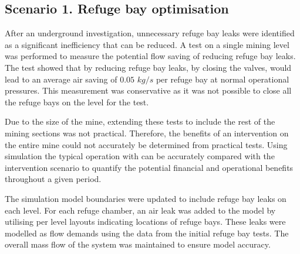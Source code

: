 	\subsection{Scenario 1. Refuge bay optimisation}
	After an underground investigation, unnecessary refuge bay leaks were identified as a significant inefficiency that can be reduced. A test on a single mining level was performed to measure the potential flow saving of reducing refuge bay leaks. The test showed that by reducing refuge bay leaks, by closing the valves, would lead to an average air saving of $0.05$ $kg/s$ per refuge bay at normal operational pressures. This measurement was conservative as it was not possible to close all the refuge bays on the level for the test. 
	\par 
	Due to the size of the mine, extending these tests to include the rest of the mining sections was not practical.  Therefore,  the benefits of an intervention on the entire mine could not accurately be determined from practical tests. Using simulation the typical operation with can be accurately compared with the intervention scenario to quantify the potential financial and operational benefits throughout a given period.
	\par
	The simulation model boundaries were updated to include refuge bay leaks on each level. For each refuge chamber, an air leak was added to the model by utilising per level layouts indicating locations of refuge bays. These leaks were modelled as flow demands using the data from the initial refuge bay tests. The overall mass flow of the system was maintained to ensure model accuracy. 
